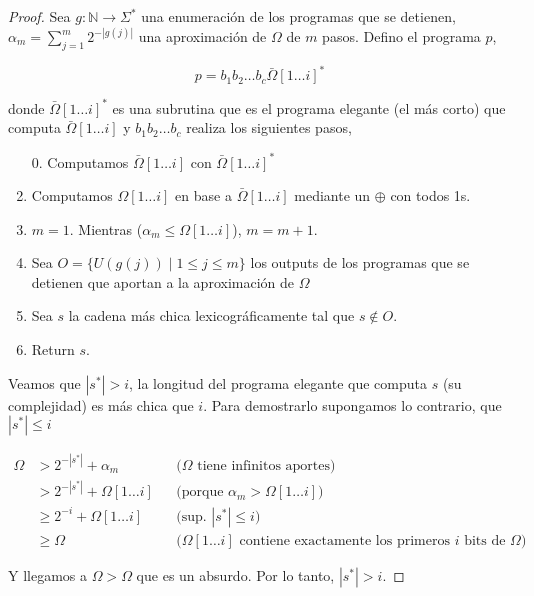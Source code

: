 \documentclass{article}
\theoremstyle{definition} %
\newcommand{\first}[2]{#2[1 \dots #1]}
\begin{document}
\begin{proof}
    Sea $g: \mathbb{N} \to \Sigma^*$ una enumeración de los programas que se
    detienen, $\alpha_m = \sum_{j = 1}^{m} 2 ^ {-|g(j)|}$ una aproximación de
    $\Omega$ de $m$ pasos. Defino el programa $p$,

    \[
        p = b_1 b_2 \dots b_c \first{i}{\bar{\Omega}}^*
    \]

    donde $\first{i}{\bar{\Omega}}^*$ es una subrutina que es el programa
    elegante (el más corto) que computa $\first{i}{\bar{\Omega}}$ y $b_1 b_2
    \dots b_c$ realiza los siguientes pasos,

    \begin{enumerate}
        \item[0.] Computamos $\first{i}{\bar{\Omega}}$ con
        $\first{i}{\bar{\Omega}}^*$
        \item Computamos $\first{i}{\Omega}$ en base a
        $\first{i}{\bar{\Omega}}$ mediante un $\oplus$ con todos 1s.
        \item $m = 1$. Mientras ($\alpha_m \leq \first{i}{\Omega}$), $m = m + 1$.
        \item Sea $O = \{ U(g(j)) \mid 1 \leq j \leq m \}$ los outputs de los
        programas que se detienen que aportan a la aproximación de $\Omega$
        \item Sea $s$ la cadena más chica lexicográficamente tal que $s \notin O$.
        \item Return $s$.
    \end{enumerate}

    Veamos que $|s^*| > i$, la longitud del programa elegante que computa $s$
    (su complejidad) es más chica que $i$. Para demostrarlo supongamos lo
    contrario, que $|s^*| \leq i$

    \begin{align*}
        \Omega 
        &> 2^{-|s^*|} + \alpha_m
            &&\text{($\Omega$ tiene infinitos aportes)}\\
        &> 2^{-|s^*|} + \first{i}{\Omega}
            &&\text{(porque $\alpha_m > \first{i}{\Omega}$)}\\
        &\geq 2^{-i} + \first{i}{\Omega}
            &&\text{(sup. $|s^*| \leq i$)}\\
        &\geq \Omega
            &&\text{($\first{i}{\Omega}$ contiene exactamente los primeros $i$ bits de $\Omega$)}
    \end{align*}

    Y llegamos a $\Omega > \Omega$ que es un absurdo. Por lo tanto, $|s^*| > i$.
    

\end{proof}
\end{document}

